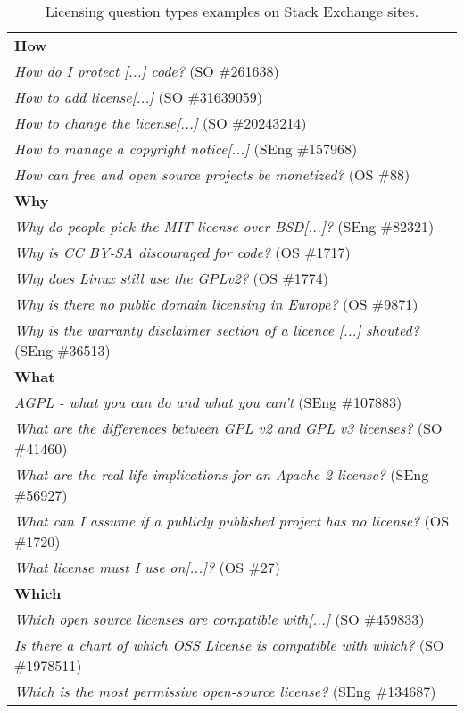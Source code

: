 \documentclass{elsarticle}
\begin{document}
\begin{table}
  \caption{Licensing question types examples on Stack Exchange sites.}
  \label{tab:type-examples}
  \centering
  \begin{adjustbox}{width=0.9\textwidth}
  \begin{tabular}{l}
    \hline
     \textbf{How} \\
    \emph{How do I protect [...] code?} (SO \#261638) \\
    \emph{How to add license[...]} (SO \#31639059)\\
    \emph{How to change the license[...]} (SO \#20243214)\\
    \emph{How to manage a copyright notice[...]} (SEng \#157968)\\
    \emph{How can free and open source projects be monetized?} (OS \#88)\\
    \hline
    \textbf{Why}\\
    \emph{Why do people pick the MIT license over BSD[...]?} (SEng \#82321) \\
    \emph{Why is CC BY-SA discouraged for code?} (OS \#1717) \\
    \emph{Why does Linux still use the GPLv2?} (OS \#1774) \\
    \emph{Why is there no public domain licensing in Europe?} (OS \#9871) \\
    \emph{Why is the warranty disclaimer section of a licence [...] shouted?} (SEng \#36513) \\
    \hline
    \textbf{What} \\
    \emph{AGPL - what you can do and what you can't} (SEng \#107883) \\
    \emph{What are the differences between GPL v2 and GPL v3 licenses?} (SO \#41460) \\
    \emph{What are the real life implications for an Apache 2 license?} (SEng \#56927) \\
    \emph{What can I assume if a publicly published project has no license?} (OS \#1720) \\
    \emph{What license must I use on[...]?} (OS \#27) \\
    \hline
    \textbf{Which} \\
    \emph{Which open source licenses are compatible with[...]} (SO \#459833) \\
    \emph{Is there a chart of which OSS License is compatible with which?} (SO \#1978511) \\
    \emph{Which is the most permissive open-source license?} (SEng \#134687) \\

\end{tabular}
\end{adjustbox}
\end{table}
\end{document}

